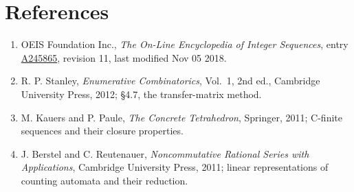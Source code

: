 \documentclass[11pt]{article}
\theoremstyle{definition}
\begin{document}
\section{References}

\begin{enumerate}

\item OEIS Foundation Inc., \emph{The On-Line Encyclopedia of Integer Sequences}, entry \href{https://oeis.org/A245865}{A245865}, revision 11, last modified Nov 05 2018.

\item R. P. Stanley, \emph{Enumerative Combinatorics}, Vol.~1, 2nd ed., Cambridge University Press, 2012; \S4.7, the transfer-matrix method.

\item M. Kauers and P. Paule, \emph{The Concrete Tetrahedron}, Springer, 2011; C-finite sequences and their closure properties.

\item J. Berstel and C. Reutenauer, \emph{Noncommutative Rational Series with Applications}, Cambridge University Press, 2011; linear representations of counting automata and their reduction.

\end{enumerate}
\end{document}
